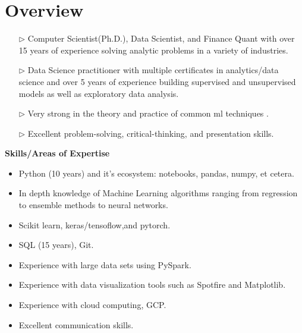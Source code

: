 \documentclass[10pt, letterpaper]{article} %
\providecommand{\tightlist}{%
  \setlength{\itemsep}{0pt}\setlength{\parskip}{0pt}}
\begin{document}
\vspace{-5pt}
\hypertarget{professional-experience}{\section{\texorpdfstring{
{ \textbf{ {Overview}}}}{Overview}}\label{professional-experience}}
\begin{itemize}
\tightlist

\item[$\triangleright$] Computer Scientist(Ph.D.), Data Scientist, and Finance Quant with over 15 years of experience solving analytic problems in a variety of industries. 

\item[$\triangleright$] Data Science practitioner with multiple certificates in analytics/data science and over 5 years of experience building supervised and unsupervised models as well as exploratory data analysis. 

\item[$\triangleright$] Very strong in the theory and  practice of common ml techniques .

\item[$\triangleright$]  Excellent problem-solving, critical-thinking, and presentation skills.

\end{itemize}
{\textbf {Skills/Areas of Expertise}}
\vspace{-7pt}
\begin{multicols}{2}
  \begin{itemize}
	\tightlist
	\item Python (10 years) and it's ecosystem: notebooks, pandas, numpy, et cetera.
	\item In depth knowledge of Machine Learning algorithms ranging from regression to ensemble methods to neural networks.	
	\item Scikit learn, keras/tensoflow,and pytorch.
	\item SQL (15 years), Git.
	\item Experience with large data sets using PySpark.
	\item Experience with data visualization tools such as Spotfire and Matplotlib.
	\item Experience with cloud computing, GCP.
     \item Excellent communication skills.
\end{itemize}
\end{multicols}
\vspace{-10pt}
\end{document}
